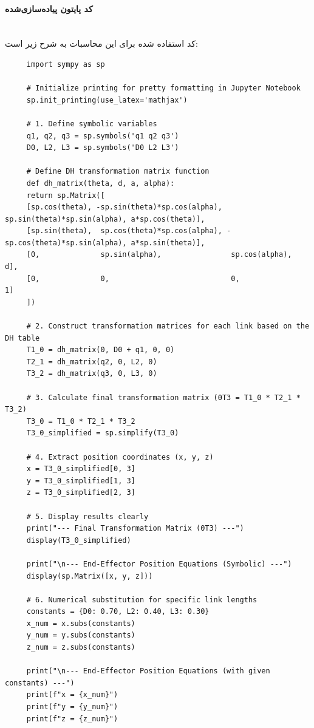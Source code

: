 \documentclass{article}
\begin{document}
\paragraph{کد پایتون پیاده‌سازی‌شده}\mbox{}\\
کد استفاده شده برای این محاسبات به شرح زیر است:

\begin{latin}
\begin{LTR}
\begin{verbatim}
     import sympy as sp
     
     # Initialize printing for pretty formatting in Jupyter Notebook
     sp.init_printing(use_latex='mathjax')
     
     # 1. Define symbolic variables
     q1, q2, q3 = sp.symbols('q1 q2 q3')
     D0, L2, L3 = sp.symbols('D0 L2 L3')
     
     # Define DH transformation matrix function
     def dh_matrix(theta, d, a, alpha):
     return sp.Matrix([
     [sp.cos(theta), -sp.sin(theta)*sp.cos(alpha),  sp.sin(theta)*sp.sin(alpha), a*sp.cos(theta)],
     [sp.sin(theta),  sp.cos(theta)*sp.cos(alpha), -sp.cos(theta)*sp.sin(alpha), a*sp.sin(theta)],
     [0,              sp.sin(alpha),                sp.cos(alpha),               d],
     [0,              0,                            0,                           1]
     ])
     
     # 2. Construct transformation matrices for each link based on the DH table
     T1_0 = dh_matrix(0, D0 + q1, 0, 0)
     T2_1 = dh_matrix(q2, 0, L2, 0)
     T3_2 = dh_matrix(q3, 0, L3, 0)
     
     # 3. Calculate final transformation matrix (0T3 = T1_0 * T2_1 * T3_2)
     T3_0 = T1_0 * T2_1 * T3_2
     T3_0_simplified = sp.simplify(T3_0)
     
     # 4. Extract position coordinates (x, y, z)
     x = T3_0_simplified[0, 3]
     y = T3_0_simplified[1, 3]
     z = T3_0_simplified[2, 3]
     
     # 5. Display results clearly
     print("--- Final Transformation Matrix (0T3) ---")
     display(T3_0_simplified)
     
     print("\n--- End-Effector Position Equations (Symbolic) ---")
     display(sp.Matrix([x, y, z]))
     
     # 6. Numerical substitution for specific link lengths
     constants = {D0: 0.70, L2: 0.40, L3: 0.30}
     x_num = x.subs(constants)
     y_num = y.subs(constants)
     z_num = z.subs(constants)
     
     print("\n--- End-Effector Position Equations (with given constants) ---")
     print(f"x = {x_num}")
     print(f"y = {y_num}")
     print(f"z = {z_num}")
\end{verbatim}
\end{LTR}
\end{latin}
\end{document}
